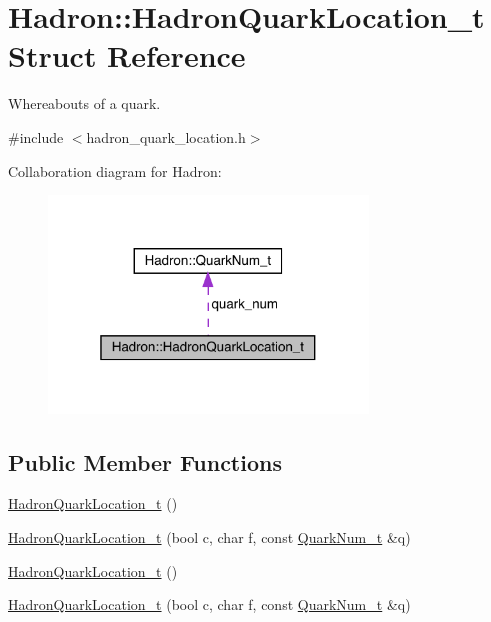 \hypertarget{structHadron_1_1HadronQuarkLocation__t}{}\section{Hadron\+:\+:Hadron\+Quark\+Location\+\_\+t Struct Reference}
\label{structHadron_1_1HadronQuarkLocation__t}


Whereabouts of a quark.  




{\ttfamily \#include $<$hadron\+\_\+quark\+\_\+location.\+h$>$}



Collaboration diagram for Hadron\+:\nopagebreak
\begin{figure}[H]
\begin{center}
\leavevmode
\includegraphics[width=241pt]{dc/d2a/structHadron_1_1HadronQuarkLocation__t__coll__graph}
\end{center}
\end{figure}
\subsection*{Public Member Functions}
\begin{DoxyCompactItemize}
\item 
\mbox{\hyperlink{structHadron_1_1HadronQuarkLocation__t_a134386bb80be45cf0767a6c45e3b6f52}{Hadron\+Quark\+Location\+\_\+t}} ()
\item 
\mbox{\hyperlink{structHadron_1_1HadronQuarkLocation__t_a214dddf7650dc22b5c424715fc27dd42}{Hadron\+Quark\+Location\+\_\+t}} (bool c, char f, const \mbox{\hyperlink{structHadron_1_1QuarkNum__t}{Quark\+Num\+\_\+t}} \&q)
\item 
\mbox{\hyperlink{structHadron_1_1HadronQuarkLocation__t_a134386bb80be45cf0767a6c45e3b6f52}{Hadron\+Quark\+Location\+\_\+t}} ()
\item 
\mbox{\hyperlink{structHadron_1_1HadronQuarkLocation__t_a214dddf7650dc22b5c424715fc27dd42}{Hadron\+Quark\+Location\+\_\+t}} (bool c, char f, const \mbox{\hyperlink{structHadron_1_1QuarkNum__t}{Quark\+Num\+\_\+t}} \&q)
\end{DoxyCompactItemize}

